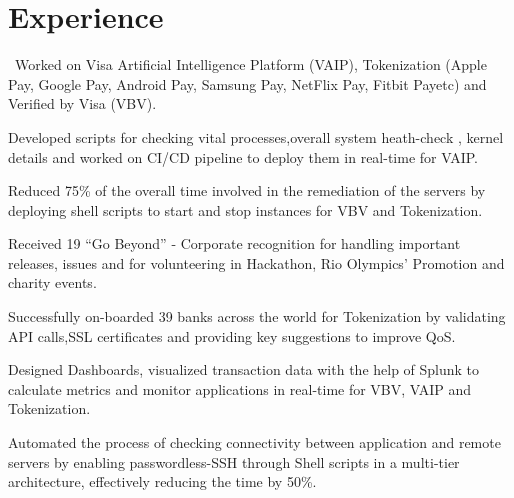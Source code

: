 \documentclass[]{deedy-resume-openfont}
\begin{document}
\hfill
\begin{minipage}[t]{0.66\textwidth} 


\section{Experience}

\begin{tightemize}
\item \ Worked on Visa Artificial Intelligence Platform (VAIP)\texttrademark, Tokenization (Apple Pay\texttrademark, Google Pay\texttrademark, Android Pay\texttrademark, Samsung Pay\texttrademark, NetFlix Pay\texttrademark, Fitbit Pay\texttrademark etc) and Verified by Visa (VBV)\texttrademark. 
\item Developed scripts for checking vital processes,overall system heath-check , kernel details and worked on CI/CD pipeline to  deploy them in real-time for VAIP. 
\item  Reduced 75\% of the overall time involved in the remediation of the servers by deploying shell scripts to start and stop instances for VBV and Tokenization.
\item  Received 19 “Go Beyond” - Corporate recognition for handling important releases, issues and for volunteering in Hackathon, Rio Olympics’ Promotion and charity events.
\end{tightemize}
\begin{tightemize}
\item  Successfully on-boarded 39 banks across the world for Tokenization by validating API calls,SSL certificates and providing key suggestions to improve QoS.
\item Designed Dashboards, visualized transaction data with the help of Splunk to calculate metrics and monitor applications in real-time for VBV, VAIP and Tokenization.
\item  Automated the process of checking connectivity between application and remote servers by enabling passwordless-SSH through Shell scripts in a multi-tier architecture, effectively reducing the time by 50\%.
\end{tightemize}



\end{minipage}
\end{document}
